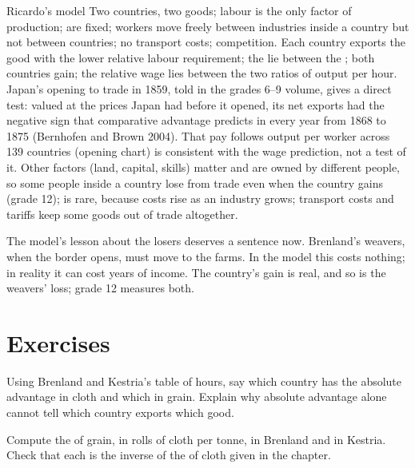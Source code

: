\begin{model}{Ricardo's model}
\assumes Two countries, two goods; labour is the only factor of production;  are
  fixed; workers move freely between industries inside a country but not between countries; no transport
  costs; competition.
\predicts Each country exports the good with the lower relative labour requirement; the  lie
  between the ; both countries gain; the relative wage lies between the two ratios of output
  per hour.
\tested Japan's opening to trade in 1859, told in the grades 6--9 volume, gives a direct test: valued at
  the prices Japan had before it opened, its net exports had the negative sign that comparative advantage
  predicts in every year from 1868 to 1875 (Bernhofen and Brown 2004). That pay follows output per worker
  across 139 countries (opening chart) is consistent with the wage prediction, not a test of it.
\breaks Other factors (land, capital, skills) matter and are owned by different people, so some people inside a
  country lose from trade even when the country gains (grade 12);  is rare, because
  costs rise as an industry grows; transport costs and tariffs keep some goods out of trade altogether.
\end{model}

The model's lesson about the losers deserves a sentence now. Brenland's weavers, when the border opens, must
move to the farms. In the model this costs nothing; in reality it can cost years of income. The country's
gain is real, and so is the weavers' loss; grade 12 measures both.

\section{Exercises}

\begin{exercise}[$\star$]\label{exo:g10:ricardo-model:1}
Using Brenland and Kestria's table of hours, say which country has the absolute advantage in cloth and which
in grain. Explain why absolute advantage alone cannot tell which country exports which good.
\end{exercise}

\begin{exercise}[$\star$]\label{exo:g10:ricardo-model:2}
Compute the  of grain, in rolls of cloth per tonne, in Brenland and in Kestria. Check that each is
the inverse of the  of cloth given in the chapter.
\end{exercise}

